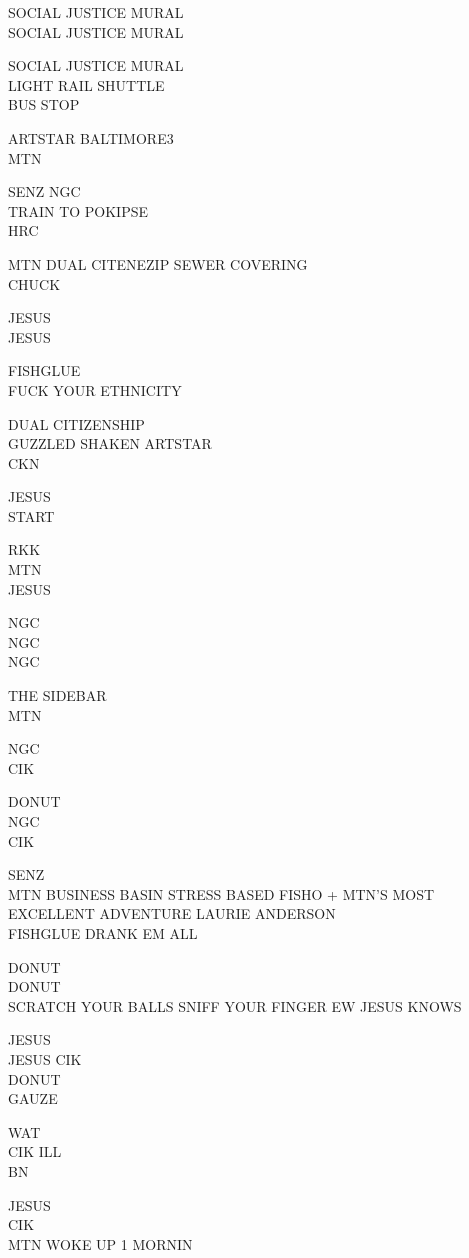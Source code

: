 \documentclass[10pt,letterpaper]{article}
\begin{document}
SOCIAL JUSTICE MURAL\\
SOCIAL JUSTICE MURAL

SOCIAL JUSTICE MURAL\\
LIGHT RAIL SHUTTLE\\
BUS STOP

ARTSTAR BALTIMORE3\\
MTN

SENZ NGC\\
TRAIN TO POKIPSE\\
HRC

MTN DUAL CITENEZIP SEWER COVERING\\
CHUCK

JESUS\\
JESUS

FISHGLUE\\
FUCK YOUR ETHNICITY

DUAL CITIZENSHIP\\
GUZZLED SHAKEN ARTSTAR\\
CKN

JESUS\\
START

RKK\\
MTN\\
JESUS

NGC\\
NGC\\
NGC

THE SIDEBAR\\
MTN

NGC\\
CIK

DONUT\\
NGC\\
CIK

SENZ\\
MTN BUSINESS BASIN STRESS BASED FISHO + MTN'S MOST EXCELLENT ADVENTURE LAURIE ANDERSON\\
FISHGLUE DRANK EM ALL

DONUT\\
DONUT\\
SCRATCH YOUR BALLS SNIFF YOUR FINGER EW JESUS KNOWS

JESUS\\
JESUS CIK\\
DONUT\\
GAUZE

WAT\\
CIK ILL\\
BN

JESUS\\
CIK\\
MTN WOKE UP 1 MORNIN
\end{document}
